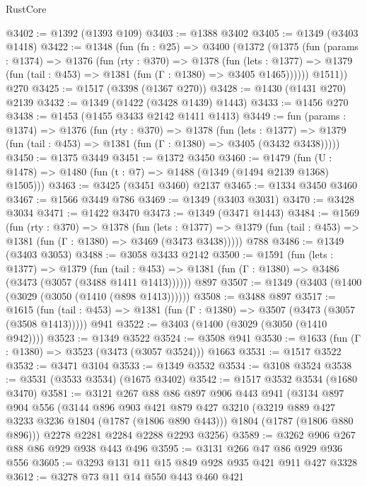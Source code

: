 \begin{lexlean}{RustCore}
\begin{coremodule}
@3402 := @1392 (@1393 @109)
@3403 := @1388 @3402
@3405 := @1349 (@3403 @1418)
@3422 := @1348
    (fun (fn : @25) =>
    @3400
      (@1372
        (@1375
          (fun (params : @1374) =>
          @1376
            (fun (rty : @370) =>
            @1378
              (fun (lets : @1377) =>
              @1379 (fun (tail : @453) => @1381 (fun (Γ : @1380) => @3405 @1465))))))
        @1511))
    @270
@3425 := @1517 (@3398 (@1367 @270))
@3428 := @1430 (@1431 @270) @2139
@3432 := @1349 (@1422 (@3428 @1439) @1443)
@3433 := @1456 @270
@3438 := @1453 (@1455 @3433 @2142 @1411 @1413)
@3449 := fun (params : @1374) =>
  @1376
    (fun (rty : @370) =>
    @1378
      (fun (lets : @1377) =>
      @1379 (fun (tail : @453) => @1381 (fun (Γ : @1380) => @3405 (@3432 @3438)))))
@3450 := @1375 @3449
@3451 := @1372 @3450
@3460 := @1479 (fun (U : @1478) => @1480 (fun (t : @7) => @1488 (@1349 (@1494 @2139 @1368) @1505)))
@3463 := @3425 (@3451 @3460) @2137
@3465 := @1334 @3450 @3460
@3467 := @1566 @3449 @786
@3469 := @1349 (@3403 @3031)
@3470 := @3428 @3034
@3471 := @1422 @3470
@3473 := @1349 (@3471 @1443)
@3484 := @1569
    (fun (rty : @370) =>
    @1378
      (fun (lets : @1377) =>
      @1379 (fun (tail : @453) => @1381 (fun (Γ : @1380) => @3469 (@3473 @3438)))))
    @788
@3486 := @1349 (@3403 @3053)
@3488 := @3058 @3433 @2142
@3500 := @1591
    (fun (lets : @1377) =>
    @1379
      (fun (tail : @453) => @1381 (fun (Γ : @1380) => @3486 (@3473 (@3057 (@3488 @1411 @1413))))))
    @897
@3507 := @1349 (@3403 (@1400 (@3029 (@3050 (@1410 (@898 @1413))))))
@3508 := @3488 @897
@3517 := @1615
    (fun (tail : @453) => @1381 (fun (Γ : @1380) => @3507 (@3473 (@3057 (@3508 @1413)))))
    @941
@3522 := @3403 (@1400 (@3029 (@3050 (@1410 @942))))
@3523 := @1349 @3522
@3524 := @3508 @941
@3530 := @1633 (fun (Γ : @1380) => @3523 (@3473 (@3057 @3524))) @1663
@3531 := @1517 @3522
@3532 := @3471 @3104
@3533 := @1349 @3532
@3534 := @3108 @3524
@3538 := @3531 (@3533 @3534) (@1675 @3402)
@3542 := @1517 @3532 @3534 (@1680 @3470)
@3581 := @3121
    @267
    @88
    @86
    @897
    @906
    @443
    @941
    (@3134
      @897
      @904
      @556
      (@3144
        @896
        @903
        @421
        @879
        @427
        @3210
        (@3219 @889 @427 @3233 @3236 @1804 (@1787 (@1806 @890 @443)))
        @1804
        (@1787 (@1806 @880 @896)))
      @2278
      @2281
      @2284
      @2288
      @2293
      @3256)
@3589 := @3262 @906 @267 @88 @86 @929 @938 @443 @496
@3595 := @3131 @266 @47 @86 @929 @936 @556
@3605 := @3293 @131 @11 @15 @849 @928 @935 @421 @911 @427 @3328
@3612 := @3278 @73 @11 @14 @550 @443 @460 @421

\end{coremodule}
\end{lexlean}
